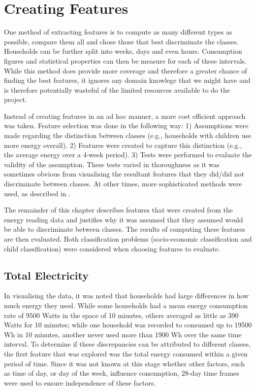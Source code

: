 \section{Creating Features}
One method of extracting features is to compute as many different types as possible, compare them all and chose those that best discriminate the classes. Households can be further split into weeks, days and even hours. Consumption figures and statistical properties can then be measure for each of these intervals. While this method does provide more coverage and therefore a greater chance of finding the best features, it ignores any domain knowlege that we might have and is therefore potentially wasteful of the limited resources available to do the project. 

Instead of creating features in an ad hoc manner, a more cost efficient approach was taken. Feature selection was done in the following way: 1) Assumptions were made regarding the distinction between classes (e.g., households with children use more energy overall). 2) Features were created to capture this distinction (e.g., the average energy over a 4-week period). 3) Tests were performed to evaluate the validity of the assumption. These tests varied in thoroughness as it was sometimes obvious from visualising the resultant features that they did/did not discriminate between classes. At other times, more sophisticated methods were used, as described in \featureSelectionSection.
\newline

The remainder of this chapter describes features that were created from the energy reading data and justifies why it was assumed that they assumed would be able to discriminate between classes. The results of computing these features are then evaluated. Both classification problems (socio-economic classification and child classification) were considered when choosing features to evaluate.

\subsection*{Total Electricity}
In visualising the data, it was noted that households had large differences in how much energy they used. While some households had a mean energy consumption rate of 9500 Watts in the space of 10 minutes, others averaged as little as 390 Watts for 10 minutes; while one household was recorded to consumed up to 19500 Wh in 10 minutes, another never used more than 1900 Wh over the same time interval. To determine if these discrepancies can be attributed to different classes, the first feature that was explored was the total energy consumed within a given period of time. Since it was not known at this stage whether other factors, such as time of day, or day of the week, influence consumption, 28-day time frames were used to ensure independence of these factors.

